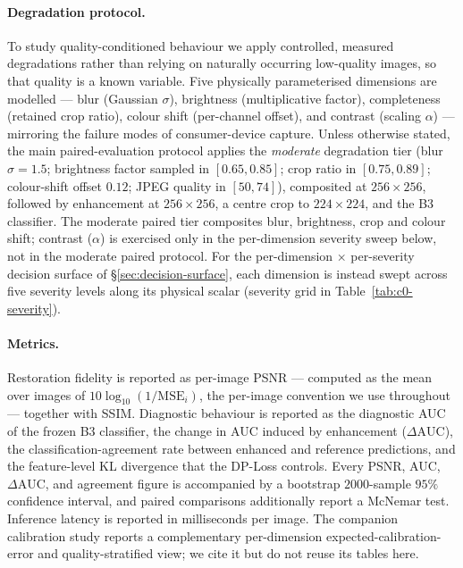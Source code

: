 \paragraph{Degradation protocol.}
To study quality-conditioned behaviour we apply controlled, measured degradations
rather than relying on naturally occurring low-quality images, so that quality is
a known variable. Five physically parameterised dimensions are modelled --- blur
(Gaussian $\sigma$), brightness (multiplicative factor), completeness (retained
crop ratio), colour shift (per-channel offset), and contrast (scaling
$\alpha$) --- mirroring the failure modes of consumer-device capture. Unless
otherwise stated, the main paired-evaluation protocol applies the \emph{moderate}
degradation tier (blur $\sigma=1.5$; brightness factor sampled in $[0.65, 0.85]$;
crop ratio in $[0.75, 0.89]$; colour-shift offset $0.12$; JPEG quality in
$[50, 74]$), composited at $256\times256$, followed by enhancement at $256\times256$,
a centre crop to $224\times224$, and the B3 classifier. The moderate paired tier
composites blur, brightness, crop and colour shift; contrast ($\alpha$) is exercised
only in the per-dimension severity sweep below, not in the moderate paired protocol.
For the per-dimension
$\times$ per-severity decision surface of \S\ref{sec:decision-surface}, each
dimension is instead swept across five severity levels along its physical scalar
(severity grid in Table~\ref{tab:c0-severity}).

\paragraph{Metrics.}
Restoration fidelity is reported as per-image PSNR --- computed as the mean over
images of $10\log_{10}(1/\mathrm{MSE}_i)$, the per-image convention we use
throughout --- together with SSIM. Diagnostic behaviour is reported as the
diagnostic AUC of the frozen B3 classifier, the change in AUC induced by
enhancement ($\Delta\mathrm{AUC}$), the classification-agreement rate between
enhanced and reference predictions, and the feature-level KL divergence that the
DP-Loss controls. Every PSNR, AUC, $\Delta\mathrm{AUC}$, and agreement figure is
accompanied by a bootstrap $2000$-sample $95\%$ confidence interval, and paired
comparisons additionally report a McNemar test. Inference latency is reported in
milliseconds per image. The companion calibration study reports a complementary
per-dimension expected-calibration-error and quality-stratified view; we cite it
\citep{ANON-BMVC} but do not reuse its tables here.

